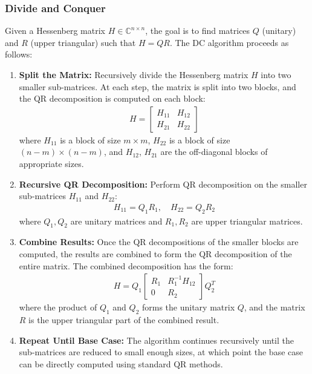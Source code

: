 \documentclass[12pt]{article}
\numberwithin{equation}{subsubsection}
\begin{document}
\subsubsection{Divide and Conquer}

Given a Hessenberg matrix $ H \in \mathbb{C}^{n \times n} $, the goal is to find matrices $ Q $ (unitary) and $ R $ (upper triangular) such that $ H = QR $. The DC algorithm proceeds as follows:

\begin{enumerate}
	\item \textbf{Split the Matrix:} Recursively divide the Hessenberg matrix $ H $ into two smaller sub-matrices. At each step, the matrix is split into two blocks, and the QR decomposition is computed on each block:
	      \begin{align}
	      	H = \begin{bmatrix} H_{11} & H_{12} \\ H_{21} & H_{22} \end{bmatrix}
	      \end{align}
	      where $ H_{11} $ is a block of size $ m \times m $, $ H_{22} $ is a block of size $ (n-m) \times (n-m) $, and $ H_{12} $, $ H_{21} $ are the off-diagonal blocks of appropriate sizes.
	      
	\item \textbf{Recursive QR Decomposition:} Perform QR decomposition on the smaller sub-matrices $ H_{11} $ and $ H_{22} $:
	      \begin{align}
	      	H_{11} = Q_1 R_1, \quad H_{22} = Q_2 R_2
	      \end{align}
	      where $ Q_1, Q_2 $ are unitary matrices and $ R_1, R_2 $ are upper triangular matrices.
	      
	\item \textbf{Combine Results:} Once the QR decompositions of the smaller blocks are computed, the results are combined to form the QR decomposition of the entire matrix. The combined decomposition has the form:
	      \begin{align}
	      	H = Q_1 \begin{bmatrix} R_1 & R_1^{-1} H_{12} \\ 0 & R_2 \end{bmatrix} Q_2^T
	      \end{align}
	      where the product of $ Q_1 $ and $ Q_2 $ forms the unitary matrix $ Q $, and the matrix $ R $ is the upper triangular part of the combined result.
	      
	\item \textbf{Repeat Until Base Case:} The algorithm continues recursively until the sub-matrices are reduced to small enough sizes, at which point the base case can be directly computed using standard QR methods.
\end{enumerate}
\end{document}
